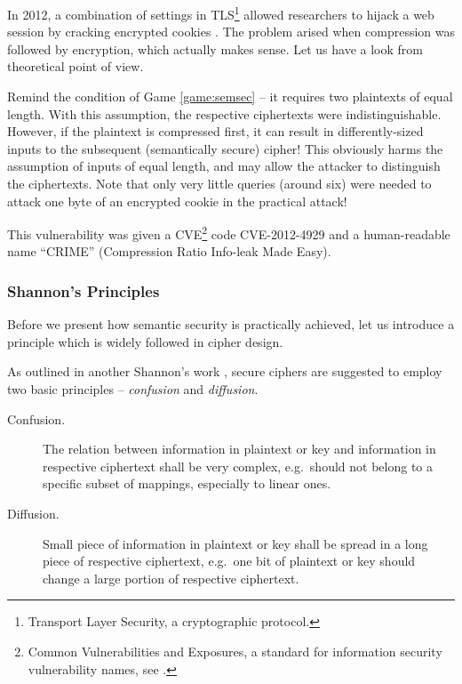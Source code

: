 \begin{example}
\label{ex:crime}
	In 2012, a combination of settings in TLS\footnote{Transport Layer Security, a cryptographic protocol.} allowed researchers to hijack a web session by cracking encrypted cookies \cite{goodin2012crime}. The problem arised when compression was followed by encryption, which actually makes sense. Let us have a look from theoretical point of view.
	
	Remind the condition of Game \ref{game:semsec} -- it requires two plaintexts of equal length. With this assumption, the respective ciphertexts were indistinguishable. However, if the plaintext is compressed first, it can result in differently-sized inputs to the subsequent (semantically secure) cipher! This obviously harms the assumption of inputs of equal length, and may allow the attacker to distinguish the ciphertexts. Note that only very little queries (around six) were needed to attack one byte of an encrypted cookie in the practical attack!
	
	This vulnerability was given a CVE\footnote{Common Vulnerabilities and Exposures, a standard for information security vulnerability names, see .} code CVE-2012-4929 and a human-readable name ``CRIME'' (Compression Ratio Info-leak Made Easy).
\end{example}

\subsubsection{Shannon's Principles}
	
	Before we present how semantic security is practically achieved, let us introduce a principle which is widely followed in cipher design.
	
	\begin{princ}[Shannon]
	\label{pri:shannon}
		As outlined in another Shannon's work \cite{shannon1949communication}, secure ciphers are suggested to employ two basic principles -- {\em confusion} and {\em diffusion}.
		\begin{description}
			\item[Confusion.] The relation between information in plaintext or key and information in respective ciphertext shall be very complex, e.g.\ should not belong to a specific subset of mappings, especially to linear ones.
			\item[Diffusion.] Small piece of information in plaintext or key shall be spread in a long piece of respective ciphertext, e.g.\ one bit of plaintext or key should change a large portion of respective ciphertext.
		\end{description}
	\end{princ}
	
